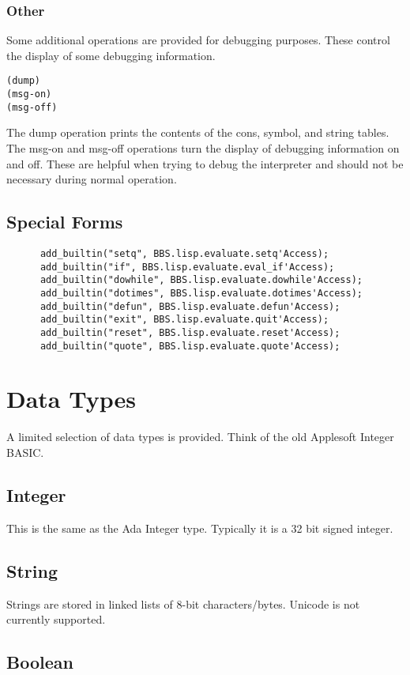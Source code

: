 \documentclass[10pt, openany]{book}
\begin{document}
\subsubsection{Other}
Some additional operations are provided for debugging purposes.  These control the display of some debugging information.
\begin{lstlisting}
(dump)
(msg-on)
(msg-off)
\end{lstlisting}

The dump operation prints the contents of the cons, symbol, and string tables.  The msg-on and msg-off operations turn the display of debugging information on and off.  These are helpful when trying to debug the interpreter and should not be necessary during normal operation.

\subsection{Special Forms}
\lstset{language=Ada}
\begin{lstlisting}
      add_builtin("setq", BBS.lisp.evaluate.setq'Access);
      add_builtin("if", BBS.lisp.evaluate.eval_if'Access);
      add_builtin("dowhile", BBS.lisp.evaluate.dowhile'Access);
      add_builtin("dotimes", BBS.lisp.evaluate.dotimes'Access);
      add_builtin("defun", BBS.lisp.evaluate.defun'Access);
      add_builtin("exit", BBS.lisp.evaluate.quit'Access);
      add_builtin("reset", BBS.lisp.evaluate.reset'Access);
      add_builtin("quote", BBS.lisp.evaluate.quote'Access);
\end{lstlisting}

\section{Data Types}
A limited selection of data types is provided.  Think of the old Applesoft Integer BASIC.

\subsection{Integer}
This is the same as the Ada Integer type.  Typically it is a 32 bit signed integer.

\subsection{String}
Strings are stored in linked lists of 8-bit characters/bytes.  Unicode is not currently supported.

\subsection{Boolean}
\end{document}
